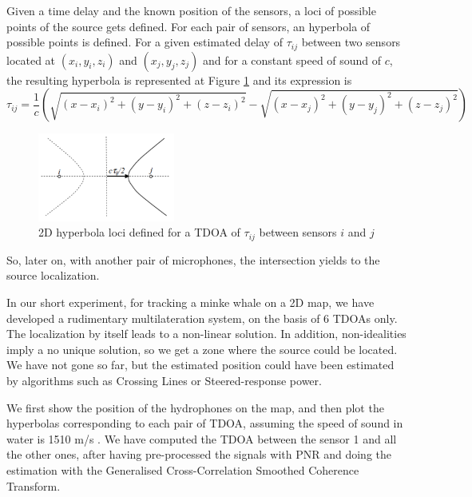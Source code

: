 Given a time delay and the known position of the sensors, a loci of possible points of the source gets defined. For each pair of sensors, an hyperbola of possible points is defined. For a given estimated delay of $\tau_{ij}$ between two sensors located at $(x_i,y_i,z_i)$ and $(x_j,y_j,z_j)$ and for a constant speed of sound of $c$, the resulting hyperbola is represented at Figure \ref{fig:hyp} and its expression is
\begin{dmath}
  \tau_{ij} = \frac{1}{c}\left(\sqrt{(x-x_i)^2 + (y-y_i)^2 + (z-z_i)^2} - 
  \sqrt{(x-x_j)^2 + (y-y_j)^2 + (z-z_j)^2} \right)
\end{dmath}

\begin{figure}[htb]
	\begin{center}
		\includegraphics[width=0.4\textwidth]{figures/tdoa.png}
	\end{center}
	\caption{2D hyperbola loci defined for a TDOA of $\tau_{ij}$ between sensors $i$ and $j$}
	\label{fig:hyp}
\end{figure}

So, later on, with another pair of microphones, the intersection yields to the source localization.

In our short experiment, for tracking a minke whale on a 2D map, we have developed a rudimentary multilateration system, on the basis of 6 TDOAs only. The localization by itself leads to a non-linear solution. In addition, non-idealities imply a no unique solution, so we get a zone where the source could be located. We have not gone so far, but the estimated position could have been estimated by algorithms such as Crossing Lines or Steered-response power.

We first show the position of the hydrophones on the map, and then plot the hyperbolas corresponding to each pair of TDOA, assuming the speed of sound in water is 1510 m/s \cite{speed-sound-seawater}.  We have computed the TDOA between the sensor 1 and all the other ones, after having pre-processed the signals with PNR and doing the estimation with the Generalised Cross-Correlation Smoothed Coherence Transform.

